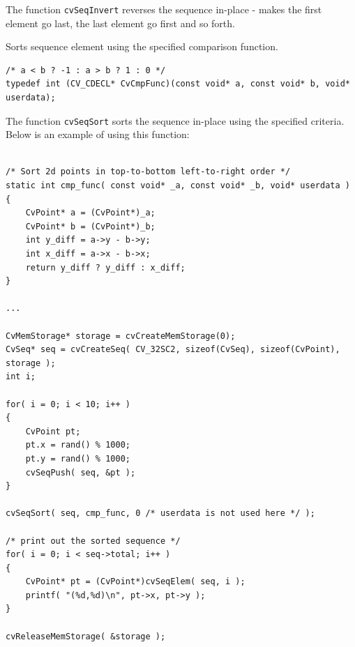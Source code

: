\begin{description}
\end{description}


The function \texttt{cvSeqInvert} reverses the sequence in-place - makes the first element go last, the last element go first and so forth.

\ifC
{}\label{SeqSort}

Sorts sequence element using the specified comparison function.


\begin{lstlisting}
/* a < b ? -1 : a > b ? 1 : 0 */
typedef int (CV_CDECL* CvCmpFunc)(const void* a, const void* b, void* userdata);
\end{lstlisting}

\begin{description}
\end{description}

The function \texttt{cvSeqSort} sorts the sequence in-place using the specified criteria. Below is an example of using this function:

\begin{lstlisting}

/* Sort 2d points in top-to-bottom left-to-right order */
static int cmp_func( const void* _a, const void* _b, void* userdata )
{
    CvPoint* a = (CvPoint*)_a;
    CvPoint* b = (CvPoint*)_b;
    int y_diff = a->y - b->y;
    int x_diff = a->x - b->x;
    return y_diff ? y_diff : x_diff;
}

...

CvMemStorage* storage = cvCreateMemStorage(0);
CvSeq* seq = cvCreateSeq( CV_32SC2, sizeof(CvSeq), sizeof(CvPoint), storage );
int i;

for( i = 0; i < 10; i++ )
{
    CvPoint pt;
    pt.x = rand() % 1000;
    pt.y = rand() % 1000;
    cvSeqPush( seq, &pt );
}

cvSeqSort( seq, cmp_func, 0 /* userdata is not used here */ );

/* print out the sorted sequence */
for( i = 0; i < seq->total; i++ )
{
    CvPoint* pt = (CvPoint*)cvSeqElem( seq, i );
    printf( "(%d,%d)\n", pt->x, pt->y );
}

cvReleaseMemStorage( &storage );

\end{lstlisting}


